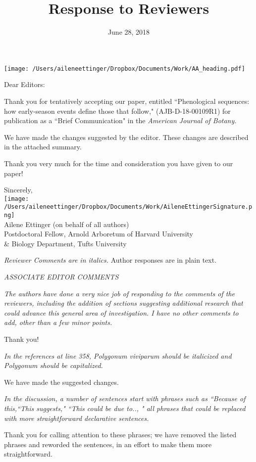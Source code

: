 \documentclass[10.95pt,a4paper]{letter}
\date{June 28, 2018}
\begin{document}
%

\begin{letter}{}
\texttt{[image: /Users/aileneettinger/Dropbox/Documents/Work/AA\_heading.pdf]}

\opening{Dear Editors:}
Thank you for tentatively accepting our paper, entitled ``Phenological sequences: how early-season events define those that follow,"  (AJB-D-18-00109R1) for publication as a ``Brief Communication" in the \emph{American Journal of Botany.} 

We have made the changes suggested by the editor. These changes are described in the attached summary.

Thank you very much for the time and consideration you have given to our paper!

Sincerely,\\

\texttt{[image: /Users/aileneettinger/Dropbox/Documents/Work/AileneEttingerSignature.png]} \\
Ailene Ettinger (on behalf of all authors)\\
Postdoctoral Fellow, Arnold Arboretum of Harvard University \\ \& Biology Department, Tufts University

\end{letter}
\clearpage

\title{Response to Reviewers}
 \emph{Reviewer Comments are in italics.} Author responses are in plain text.

\par \emph{ASSOCIATE EDITOR COMMENTS}
\par \emph{The authors have done a very nice job of responding to the comments of the reviewers, including the addition of sections  suggesting additional research that could advance this general area of investigation.  I have no other comments to add, other than a few minor points.}
\par Thank you!
\par \emph  {In the references at line 358, Polygonum viviparum should be italicized and Polygonum should be capitalized.}
\par We have made the suggested changes.   

\par \emph{In the discussion, a number of sentences start with phrases such as ``Because of this,``This suggests," ``This could be due to.., "  all phrases that could be replaced with more straightforward declarative sentences.}
\par Thank you for calling attention to these phrases; we have removed the listed phrases and reworded the sentences, in an effort to make them more straightforward. 
\end{document}
